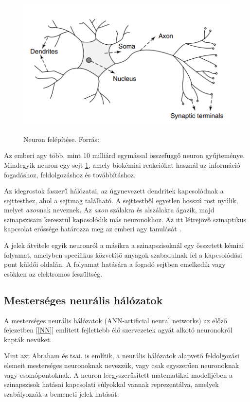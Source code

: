 \documentclass[12pt,a4]{article}
\begin{document}
    \begin{figure}[h]	
		\centering
		\includegraphics[width=1\linewidth]{neuron1}
        \label{fig:neuron1}
		\caption{Neuron felépítése. 
			Forrás:\cite{ann}}
	\end{figure}
 
	Az emberi agy több, mint 10 milliárd egymással összefüggő neuron gyűjteménye. Mindegyik neuron egy sejt \ref{fig:neuron1}, amely biokémiai reakciókat használ az információ fogadáshoz, feldolgozáshoz és továbbításhoz.
	
	Az idegrostok faszerű hálózatai, az úgynevezett dendritek kapcsolódnak a sejttesthez, ahol a sejtmag található. A sejttestből egyetlen hosszú rost nyúlik, melyet \textit{axon}nak neveznek. Az \textit{axon} szálakra és alszálakra ágazik, majd szinapszisain keresztül kapcsolódik más neuronokhoz. Az itt létrejövő szinaptikus kapcsolat erőssége határozza meg az emberi agy tanulását .
	
	A jelek átvitele egyik neuronról a másikra a szinapszisoknál egy összetett kémiai folyamat, amelyben specifikus közvetítő anyagok szabadulnak fel a kapcsolódási pont küldői oldalán. A folyamat hatására a fogadó sejtben emelkedik vagy csökken az elektromos feszültség.
	
	\newpage
	\subsection{Mesterséges neurális hálózatok}
	A mesterséges neurális hálózatok (ANN-artificial neural networks) az előző fejezetben [\autoref{NN}] említett fejlettebb élő szervezetek agyát alkotó neuronokról kapták nevüket. 
	
	Mint azt \cite{ann}Abraham és tsai. is említik, a neurális hálózatok alapvető feldolgozási elemeit mesterséges neuronoknak nevezzük, vagy csak egyszerűen neuronoknak vagy csomópontoknak. A neuron leegyszerűsített matematikai modelljében a szinapszisok hatásai kapcsolati súlyokkal vannak reprezentálva, amelyek szabályozzák a bemeneti jelek hatását.
	
\end{document}
